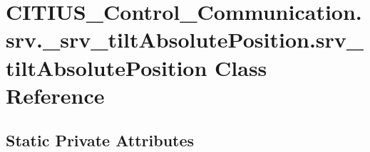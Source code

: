 \hypertarget{class_c_i_t_i_u_s___control___communication_1_1srv_1_1__srv__tilt_absolute_position_1_1srv__tilt_absolute_position}{\section{\-C\-I\-T\-I\-U\-S\-\_\-\-Control\-\_\-\-Communication.\-srv.\-\_\-srv\-\_\-tilt\-Absolute\-Position.\-srv\-\_\-tilt\-Absolute\-Position \-Class \-Reference}
\label{class_c_i_t_i_u_s___control___communication_1_1srv_1_1__srv__tilt_absolute_position_1_1srv__tilt_absolute_position}
}
\subsection*{\-Static \-Private \-Attributes}
